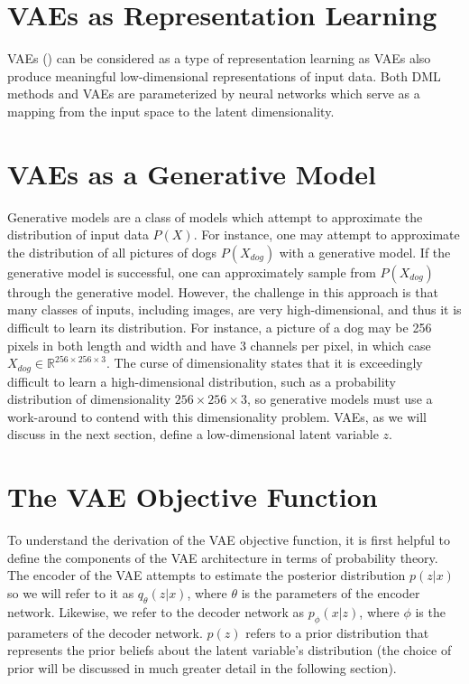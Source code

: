 \documentclass[./dissertation.tex]{subfiles}
\begin{document}

    \section{VAEs as Representation Learning}
    VAEs (\cite{kingma2013auto}) can be considered as a type of representation learning as VAEs also produce meaningful low-dimensional representations of input data. Both DML methods and VAEs are parameterized by neural networks which serve as a mapping from the input space to the latent dimensionality. 
    
    \section{VAEs as a Generative Model}
    
    Generative models are a class of models which attempt to approximate the distribution of input data $P(X)$. For instance, one may attempt to approximate the distribution of all pictures of dogs $P(X_{dog})$ with a generative model. If the generative model is successful, one can approximately sample from $P(X_{dog})$ through the generative model. However, the challenge in this approach is that many classes of inputs, including images, are very high-dimensional, and thus it is difficult to learn its distribution. For instance, a picture of a dog may be 256 pixels in both length and width and have 3 channels per pixel, in which case $X_{dog} \in \mathbb{R}^{256 \times 256 \times 3}$. The curse of dimensionality states that it is exceedingly difficult to learn a high-dimensional distribution, such as a probability distribution of dimensionality ${256 \times 256 \times 3}$, so generative models must use a work-around to contend with this dimensionality problem. VAEs, as we will discuss in the next section, define a low-dimensional latent variable $z$. 
    
    \section{The VAE Objective Function}
    To understand the derivation of the VAE objective function, it is first helpful to define the components of the VAE architecture in terms of probability theory. The encoder of the VAE attempts to estimate the posterior distribution $p(z|x)$ so we will refer to it as $q_{\theta}(z|x)$, where $\theta$ is the parameters of the encoder network. Likewise, we refer to the decoder network as $p_{\phi}(x|z)$, where $\phi$ is the parameters of the decoder network. $p(z)$ refers to a prior distribution that represents the prior beliefs about the latent variable's distribution (the choice of prior will be discussed in much greater detail in the following section). 
    
\end{document}
